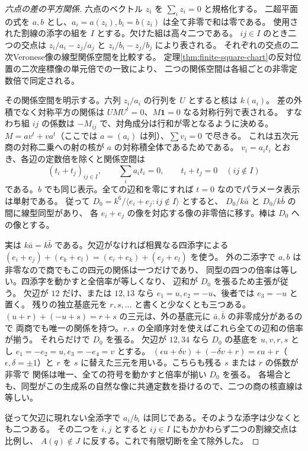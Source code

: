 \begin{proof}[六点の差の平方関係]
六点のベクトル $z_i$ を $\sum_i z_i=0$ と規格化する。
二超平面の式を $a,b$ とし、$a_i=a(z_i),b_i=b(z_i)$ は全て非零で和は零である。
使用された割線の添字の組を $I$ とする。欠けた組は高々二つである。
$ij\in I$ のとき二つの交点は $z_i/a_i-z_j/a_j$ と $z_i/b_i-z_j/b_j$ により表される。
それぞれの交点の二次Veronese像の線型関係空間を比較する。
定理\ref{thm:finite-square-chart}の反対位置の二次座標像の単元倍での一致により、
二つの関係空間は各組ごとの非零定数倍で同定される。

その関係空間を明示する。六列 $z_i/a_i$ の行列を $U$ とすると核は $k(a_i)$。
差の外積でなく対称平方の関係は $U M U^t=0$、$M\mathbf 1=0$ なる対称行列で表される。
すなわち組 $ij$ の係数は $-M_{ij}$ で、対角成分は行和が零となるように決める。
$M=av^t+va^t$（ここでは $a=(a_i)$ は列）、$\sum v_i=0$ で尽きる。
これは五次元商の対称二乗への射の核が $a$ の対称積全体であるためである。
$v_i=a_i t_i$ とおき、各辺の定数倍を除くと関係空間は
\[
         (t_i+t_j)_{ij\in I},\qquad
         \sum_i a_i t_i=0,\qquad t_i+t_j=0\quad(ij\notin I)
\]
である。$b$ でも同じ表示。全ての辺和を零にすれば $t=0$ なのでパラメータ表示は単射である。
従って $D_0=k^6/\langle e_i+e_j:ij\notin I\rangle$ とすると、
$D_0/k\bar a$ と $D_0/k\bar b$ の間に線型同型があり、
各 $e_i+e_j$ の像を対応する像の非零倍に移す。棒は $D_0$ への像とする。

実は $k\bar a=k\bar b$ である。欠辺がなければ相異なる四添字による
$(e_i+e_j)+(e_k+e_l)=(e_i+e_k)+(e_j+e_l)$ を使う。
外の二添字で $a,b$ は非零なので商でもこの四元の関係は一つだけであり、
同型の四つの倍率は等しい。四添字を動かすと全倍率が等しくなり、
辺和が $D_0$ を張るため主張が従う。
欠辺が $12$ だけ、または $12,13$ なら $e_1=u,e_2=-u$、後者では $e_3=-u$ と置く。
残りの独立基底元を $r,s,\ldots$ と書くと少なくとも三つある。
$(u+r)+(-u+s)=r+s$ の三元は、外の基底元に $\bar a,\bar b$ の非零成分があるので
両商でも唯一の関係を持つ。$r,s$ の全順序対を使えばこれら全ての辺和の倍率が揃う。
それらだけで $D_0$ を張る。
欠辺が $12,34$ なら $D_0$ の基底を $u,v,r,s$ とし $e_1=-e_2=u,e_3=-e_4=v$ とする。
$(\epsilon u+\delta v)+(-\delta v+r)=\epsilon u+r$（$\epsilon,\delta=\pm1$）と
$r$ を $s$ に替えた三元を用いる。こちらも残る $s$ または $r$ の係数が非零で
関係は唯一、全ての符号を動かすと倍率が揃い $D_0$ を張る。
各場合とも、同型がこの生成系の自然な像に共通定数を掛けるので、二つの商の核直線は等しい。

従って欠辺に現れない全添字で $a_i/b_i$ は同じである。そのような添字は少なくとも二つある。
その二つを $i,j$ とすると $ij\in I$ にもかかわらず二つの割線交点は比例し、
$A(q)\notin J$ に反する。これで有限切断を全て除外した。
\end{proof}

